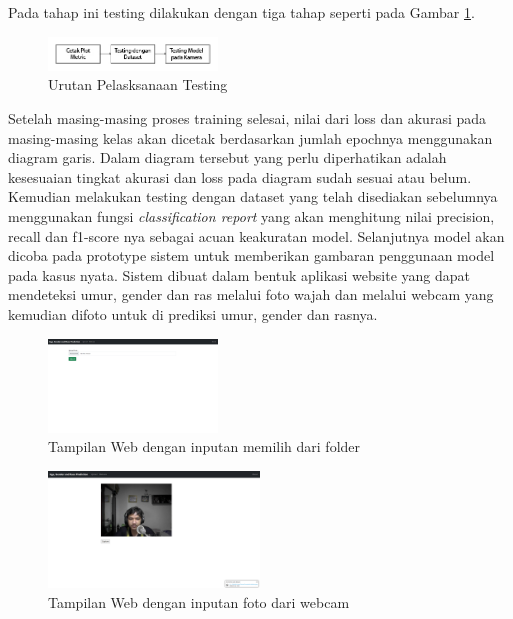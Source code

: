 Pada tahap ini testing dilakukan dengan tiga tahap seperti pada Gambar \ref{fig:testing}.
\begin{figure} [ht]
  \centering
  \includegraphics[width=0.4\textwidth]{gambar/testing.jpg}

  \caption{Urutan Pelasksanaan Testing}
  \label{fig:testing}
\end{figure}


Setelah masing-masing proses training selesai, nilai dari loss dan akurasi pada masing-masing kelas akan dicetak berdasarkan jumlah epochnya 
menggunakan diagram garis. Dalam diagram tersebut yang perlu diperhatikan adalah kesesuaian tingkat akurasi dan loss pada diagram sudah sesuai 
atau belum. Kemudian melakukan testing dengan dataset yang telah disediakan sebelumnya menggunakan fungsi \textit{classification report} yang akan 
menghitung nilai precision, recall dan f1-score nya sebagai acuan keakuratan model. Selanjutnya model akan dicoba pada prototype sistem untuk 
memberikan gambaran penggunaan model pada kasus nyata. Sistem dibuat dalam bentuk aplikasi website yang dapat mendeteksi umur, gender dan ras 
melalui foto wajah dan melalui webcam yang kemudian difoto untuk di prediksi umur, gender dan rasnya.

\begin{figure} [ht]
  \centering
  \includegraphics[width=0.4\textwidth]{gambar/webKosong.png}

  \caption{Tampilan Web dengan inputan memilih dari folder}
  \label{fig:webupload}
\end{figure}

\begin{figure} [ht]
  \centering
  \includegraphics[width=0.5\textwidth]{gambar/WebKosong2.png}

  \caption{Tampilan Web dengan inputan foto dari webcam}
  \label{fig:webfoto}
\end{figure}

